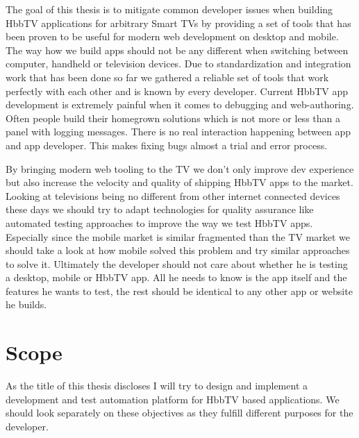 The goal of this thesis is to mitigate common developer issues when building HbbTV applications for arbitrary
Smart TVs by providing a set of tools that has been proven to be useful for modern web development on desktop
and mobile. The way how we build apps should not be any different when switching between computer, handheld or
television devices. Due to standardization and integration work that has been done so far we gathered a reliable
set of tools that work perfectly with each other and is known by every developer. Current HbbTV app development
is extremely painful when it comes to debugging and web-authoring. Often people build their homegrown solutions
which is not more or less than a panel with logging messages. There is no real interaction happening between app
and app developer. This makes fixing bugs almost a trial and error process.

By bringing modern web tooling to the TV we don't only improve dev experience but also increase the velocity
and quality of shipping HbbTV apps to the market. Looking at televisions being no different from other internet
connected devices these days we should try to adapt technologies for quality assurance like automated testing
approaches to improve the way we test HbbTV apps. Especially since the mobile market is similar fragmented
than the TV market we should take a look at how mobile solved this problem and try similar approaches to solve
it. Ultimately the developer should not care about whether he is testing a desktop, mobile or HbbTV app. All
he needs to know is the app itself and the features he wants to test, the rest should be identical to any other
app or website he builds.

\section{Scope\label{sec:scope}}

As the title of this thesis discloses I will try to design and implement a development and test automation
platform for HbbTV based applications. We should look separately on these objectives as they fulfill different
purposes for the developer.

